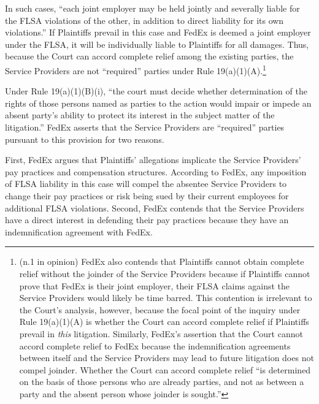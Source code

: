 \documentclass[11pt,letterpaper,twoside]{article}
\begin{document}
In such cases, ``each joint employer may be held jointly and severally
liable for the FLSA violations of the other, in addition to direct
liability for its own violations.'' If Plaintiffs prevail in this case
and FedEx is deemed a joint employer under the FLSA, it will be
individually liable to Plaintiffs for all damages. Thus, because the
Court can accord complete relief among the existing parties, the Service
Providers are not ``required'' parties under Rule
19(a)(1)(A).\footnote{(n.1 in opinion) FedEx also contends that
  Plaintiffs cannot obtain complete relief without the joinder of the
  Service Providers because if Plaintiffs cannot prove that FedEx is
  their joint employer, their FLSA claims against the Service Providers
  would likely be time barred. This contention is irrelevant to the
  Court's analysis, however, because the focal point of the inquiry
  under Rule 19(a)(1)(A) is whether the Court can accord complete relief
  if Plaintiffs prevail in \emph{this} litigation. Similarly, FedEx's
  assertion that the Court cannot accord complete relief to FedEx
  because the indemnification agreements between itself and the Service
  Providers may lead to future litigation does not compel joinder.
  Whether the Court can accord complete relief ``is determined on the
  basis of those persons who are already parties, and not as between a
  party and the absent person whose joinder is sought.''}

Under Rule 19(a)(1)(B)(i), ``the court must decide whether determination
of the rights of those persons named as parties to the action would
impair or impede an absent party's ability to protect its interest in
the subject matter of the litigation.'' FedEx asserts that the Service
Providers are ``required'' parties pursuant to this provision for two
reasons.

First, FedEx argues that Plaintiffs' allegations implicate the Service
Providers' pay practices and compensation structures. According to
FedEx, any imposition of FLSA liability in this case will compel the
absentee Service Providers to change their pay practices or risk being
sued by their current employees for additional FLSA violations. Second,
FedEx contends that the Service Providers have a direct interest in
defending their pay practices because they have an indemnification
agreement with FedEx.
\end{document}
